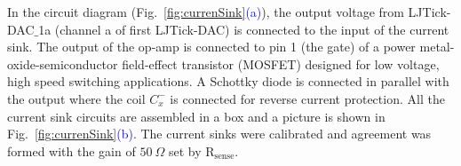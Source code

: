 

In the circuit diagram (Fig.~\ref{fig:currenSink}\textcolor{blue}{(a)}), the output voltage from LJTick-DAC$\_$1a (channel a of first LJTick-DAC) is connected to the input of the current sink. The output of the op-amp is connected to pin 1 (the gate) of a power metal-oxide-semiconductor field-effect transistor (MOSFET) designed for low voltage, high speed switching applications. A Schottky diode is connected in parallel with the output where the coil $C_x^-$ is connected for reverse current protection. All the current sink circuits are assembled in a box and a picture is shown in Fig.~\ref{fig:currenSink}\textcolor{blue}{(b)}. The current sinks were calibrated and agreement was formed with the gain of $50~\Omega$ set by $\mathrm{R_{sense}}$.  




